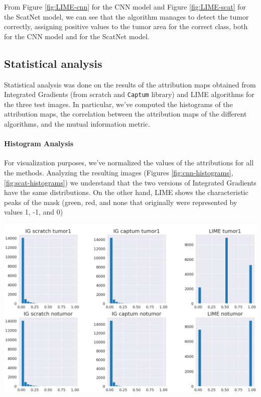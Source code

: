 \documentclass[11pt]{article}
\newenvironment{Figure}
  {\par\medskip\noindent\minipage{\linewidth}}
  {\endminipage\par\medskip}
\begin{document}
\begin{multicols*}{2}
From Figure \ref{fig:LIME-cnn} for the CNN model and Figure \ref{fig:LIME-scat} for the ScatNet model, we can see that the algorithm manages to detect the tumor correctly, assigning positive values to the tumor area for the correct class, both for the CNN model and for the ScatNet model.


\subsection{Statistical analysis}
Statistical analysis was done on the results of the attribution maps obtained from Integrated Gradients (from scratch and \texttt{Captum} library) and LIME algorithms for the three test images. In particular, we've computed the histograms of the attribution maps, the correlation between the attribution maps of the different algorithms, and the mutual information metric.

\paragraph{Histogram Analysis}
For visualization purposes, we've normalized the values of the attributions for all the methods. Analyzing the resulting images (Figures \ref{fig:cnn-histograms}, \ref{fig:scat-histograms}) we understand that the two versions of Integrated Gradients have the same distributions. On the other hand, LIME shows the characteristic peaks of the mask (green, red, and none that originally were represented by values 1, -1, and 0)

\begin{Figure}
    \includegraphics[width=\linewidth]{images/cnn_histograms.png}
    \label{fig:cnn-histograms}
\end{Figure}


\end{multicols*}
\end{document}
